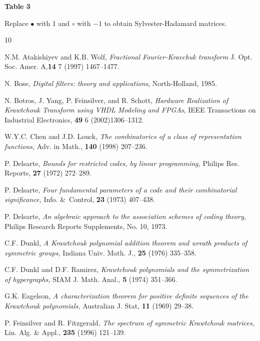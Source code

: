 \documentclass[12pt]{article}
\numberwithin{equation}{section}
\begin{document}
\centerline{{\bf Table 3} }
\bigskip
\hfill{\footnotesize
Replace $\bullet$ with 1 and $\circ$ with $-1$ to obtain Sylvester-Hadamard matrices.}\hfill


\begin{thebibliography}{10}

N.M. Atakishiyev and K.B. Wolf,
\emph{Fractional Fourier-Kravchuk transform}
J. Opt. Soc. Amer. A,{\bf 14} 7 (1997) 1467--1477.

N. Bose,
\emph{Digital filters: theory and applications},
North-Holland, 1985.

N. Botros, J. Yang, P. Feinsilver, and R. Schott, 
\emph{Hardware Realization of Krawtchouk Transform using VHDL Modeling and FPGAs},
IEEE Transactions on Industrial Electronics, {\bf 49} 6  (2002)1306--1312.

W.Y.C. Chen and J.D. Louck, 
\emph{The combinatorics of a class of representation functions,} 
Adv. in Math., {\bf 140} (1998) 207--236. 

P. Delsarte,
\emph{Bounds for restricted codes, by linear programming,}
Philips Res. Reports, {\bf 27} (1972) 272--289.

P. Delsarte,
\emph{Four fundamental parameters of a code and their combinatorial
significance,}
{Info. \&\ Control}, {\bf 23} (1973) 407--438.

P. Delsarte,  
\emph{An algebraic approach to the association schemes of coding theory,}
{Philips Research Reports Supplements}, No. 10, 1973.

C.F. Dunkl,
\emph{A Krawtchouk polynomial addition theorem and  wreath products of
symmetric
groups,} 
{Indiana Univ. Math. J.},  {\bf 25} (1976) 335--358.

C.F. Dunkl and D.F. Ramirez,
\emph{Krawtchouk polynomials and the symmetrization of hypergraphs,}
{SIAM J. Math. Anal.}, {\bf 5} (1974) 351--366.

G.K. Eagelson,
\emph{A characterization theorem for positive definite sequences of the
Krawtchouk polynomials,}
{Australian J. Stat}, {\bf 11} (1969) 29--38.

P. Feinsilver and R. Fitzgerald,
\emph{The spectrum of symmetric Krawtchouk matrices,}
{Lin. Alg. \& Appl.}, {\bf 235} (1996) 121--139. 



\end{thebibliography}
\end{document}
